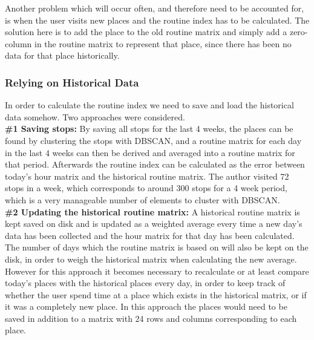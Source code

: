 Another problem which will occur often, and therefore need to be accounted for, is when the user visits new places and the routine index has to be calculated. The solution here is to add the place to the old routine matrix and simply add a zero-column in the routine matrix to represent that place, since there has been no data for that place historically. 

\subsubsection*{Relying on Historical Data}
In order to calculate the routine index we need to save and load the historical data somehow. Two approaches were considered.\\

\textbf{\#1 Saving stops:} By saving all stops for the last 4 weeks, the places can be found by clustering the stops with DBSCAN, and a routine matrix for each day in the last 4 weeks can then be derived and averaged into a routine matrix for that period. Afterwards the routine index can be calculated as the error between today's hour matrix and the historical routine matrix. The author visited 72 stops in a week, which corresponds to around 300 stops for a 4 week period, which is a very manageable number of elements to cluster with DBSCAN.\\

\textbf{\#2 Updating the historical routine matrix:} A historical routine matrix is kept saved on disk and is updated as a weighted average every time a new day's data has been collected and the hour matrix for that day has been calculated. The number of days which the routine matrix is based on will also be kept on the disk, in order to weigh the historical matrix when calculating the new average. However for this approach it becomes necessary to recalculate or at least compare today's places with the historical places every day, in order to keep track of whether the user spend time at a place which exists in the historical matrix, or if it was a completely new place. In this approach the places would need to be saved in addition to a matrix with 24 rows and columns corresponding to each place.

